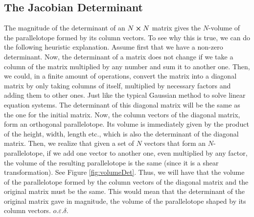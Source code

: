 \documentclass[11pt, a4paper]{article} %
\begin{document}
\subsection*{ The Jacobian Determinant\vspace{-0.2cm}}
The magnitude of the determinant of an $N\cross N$ matrix gives the $N$-volume of the parallelotope formed by its column vectors. To see why this is true, we can do the following heuristic explanation. Assume first that we have a non-zero determinant. Now, the determinant of a matrix does not change if we take a column of the matrix multiplied by any number and sum it to another one. Then, we could, in a finite amount of operations, convert the matrix into a diagonal matrix by only taking columns of itself, multiplied by necessary factors and adding them to other ones. Just like the typical Gaussian method to solve linear equation systems. The determinant of this diagonal matrix will be the same as the one for the initial matrix. Now, the column vectors of the diagonal matrix, form an orthogonal parallelotope. Its volume is immediately given by the product of the height, width, length etc., which is also the determinant of the diagonal matrix. Then, we realize that given a set of $N$ vectors that form an $N$-parallelotope, if we add one vector to another one, even multiplied by any factor, the volume of the resulting parallelotope is the same (since it is a shear transformation). See Figure \ref{fig:volumeDet}. Thus, we will have that the volume of the parallelotope formed by the column vectors of the diagonal matrix and the original matrix must be the same. This would mean that the determinant of the original matrix gave in magnitude, the volume of the parallelotope shaped by its column vectors. $o.\varepsilon.\delta$.\vspace{0.2cm}
\end{document}
